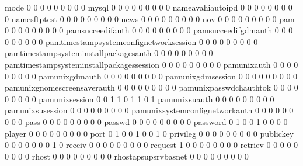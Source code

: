 \documentclass[compress,8pt]{beamer}
\begin{document}
\begin{frame}
\begin{Schunk}
  mode                                       0   0   0   0   0   0   0   0   0
  mysql                                      0   0   0   0   0   0   0   0   0
  nameavahiautoipd                           0   0   0   0   0   0   0   0   0
  namesftptest                               0   0   0   0   0   0   0   0   0
  news                                       0   0   0   0   0   0   0   0   0
  nov                                        0   0   0   0   0   0   0   0   0
  pam                                        0   0   0   0   0   0   0   0   0
  pamsucceedifauth                           0   0   0   0   0   0   0   0   0
  pamsucceedifgdmauth                        0   0   0   0   0   0   0   0   0
  pamtimestampsystemconfignetworksession     0   0   0   0   0   0   0   0   0
  pamtimestampsysteminstallpackagesauth      0   0   0   0   0   0   0   0   0
  pamtimestampsysteminstallpackagessession   0   0   0   0   0   0   0   0   0
  pamunixauth                                0   0   0   0   0   0   0   0   0
  pamunixgdmauth                             0   0   0   0   0   0   0   0   0
  pamunixgdmsession                          0   0   0   0   0   0   0   0   0
  pamunixgnomescreensaverauth                0   0   0   0   0   0   0   0   0
  pamunixpasswdchauthtok                     0   0   0   0   0   0   0   0   0
  pamunixsession                             0   0   1   1   0   1   1   0   1
  pamunixsuauth                              0   0   0   0   0   0   0   0   0
  pamunixsusession                           0   0   0   0   0   0   0   0   0
  pamunixsystemconfignetworkauth             0   0   0   0   0   0   0   0   0
  pass                                       0   0   0   0   0   0   0   0   0
  passwd                                     0   0   0   0   0   0   0   0   0
  password                                   0   1   0   0   1   0   0   0   0
  player                                     0   0   0   0   0   0   0   0   0
  port                                       0   1   0   0   1   0   0   1   0
  privileg                                   0   0   0   0   0   0   0   0   0
  publickey                                  0   0   0   0   0   0   0   1   0
  receiv                                     0   0   0   0   0   0   0   0   0
  request                                    1   0   0   0   0   0   0   0   0
  retriev                                    0   0   0   0   0   0   0   0   0
  rhost                                      0   0   0   0   0   0   0   0   0
  rhostapsupsrvbasnet                        0   0   0   0   0   0   0   0   0

\end{Schunk}
\end{frame}
\end{document}
